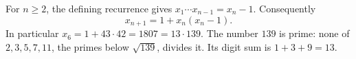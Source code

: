 For $n\ge2$, the defining recurrence gives $x_1\cdots x_{n-1}=x_n-1$. Consequently
\[
x_{n+1}=1+x_n(x_n-1).
\]
In particular $x_6=1+43\cdot42=1807=13\cdot139$. The number $139$ is prime: none of $2,3,5,7,11$, the primes below $\sqrt{139}$, divides it. Its digit sum is $\boxed{1+3+9=13}$.

